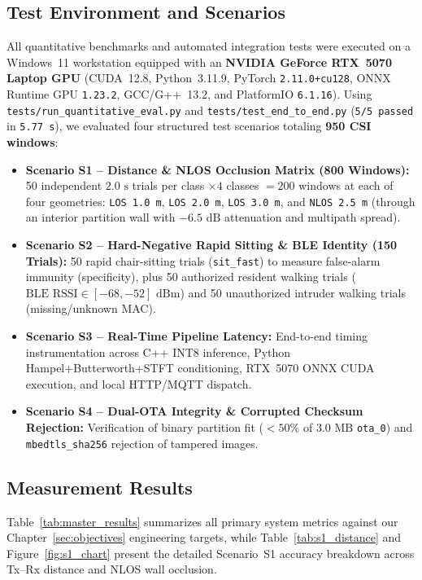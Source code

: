 \documentclass{hcmut-report}
\begin{document}
\subsection[Test Environment and Scenarios]{Test Environment and Scenarios}
\label{sec:test_env}

All quantitative benchmarks and automated integration tests were executed on a Windows~11 workstation equipped with an \textbf{NVIDIA GeForce RTX~5070 Laptop GPU} (CUDA~12.8, Python~3.11.9, PyTorch \texttt{2.11.0+cu128}, ONNX Runtime GPU \texttt{1.23.2}, GCC/G++~13.2, and PlatformIO \texttt{6.1.16}). Using \texttt{tests/\allowbreak run\_quantitative\_eval.py} and \texttt{tests/\allowbreak test\_end\_to\_end.py} (\texttt{5/5 passed} in \texttt{5.77~s}), we evaluated four structured test scenarios totaling \textbf{950 CSI windows}:
\begin{itemize}
  \item \textbf{Scenario S1 -- Distance \& NLOS Occlusion Matrix (800 Windows):} 50 independent $2.0\text{ s}$ trials per class $\times 4$ classes $= 200$ windows at each of four geometries: \texttt{LOS 1.0~m}, \texttt{LOS 2.0~m}, \texttt{LOS 3.0~m}, and \texttt{NLOS 2.5~m} (through an interior partition wall with $-6.5\text{ dB}$ attenuation and multipath spread).
  \item \textbf{Scenario S2 -- Hard-Negative Rapid Sitting \& BLE Identity (150 Trials):} 50 rapid chair-sitting trials (\texttt{sit\_fast}) to measure false-alarm immunity (specificity), plus 50 authorized resident walking trials ($\text{BLE RSSI} \in [-68, -52]\text{ dBm}$) and 50 unauthorized intruder walking trials (missing/unknown MAC).
  \item \textbf{Scenario S3 -- Real-Time Pipeline Latency:} End-to-end timing instrumentation across C++ INT8 inference, Python Hampel+Butterworth+STFT conditioning, RTX~5070 ONNX CUDA execution, and local HTTP/MQTT dispatch.
  \item \textbf{Scenario S4 -- Dual-OTA Integrity \& Corrupted Checksum Rejection:} Verification of binary partition fit ($<50\%$ of $3.0\text{ MB}$ \texttt{ota\_0}) and \texttt{mbedtls\_sha256} rejection of tampered images.
\end{itemize}

\subsection[Measurement Results]{Measurement Results}
\label{sec:results}

Table~\ref{tab:master_results} summarizes all primary system metrics against our Chapter~\ref{sec:objectives} engineering targets, while Table~\ref{tab:s1_distance} and Figure~\ref{fig:s1_chart} present the detailed Scenario~S1 accuracy breakdown across Tx--Rx distance and NLOS wall occlusion.
\end{document}
